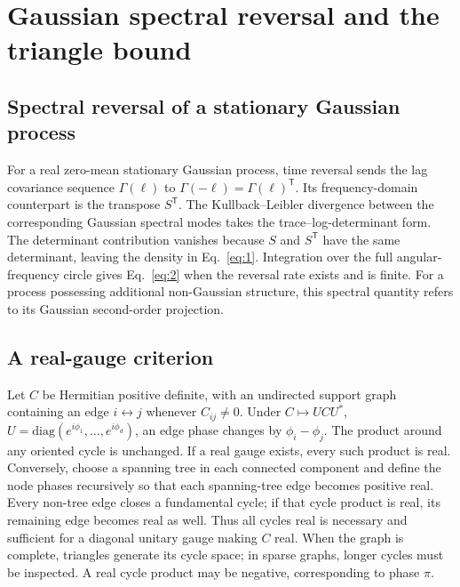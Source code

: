 \section{Gaussian spectral reversal and the triangle bound}\label{app:triangle}

\subsection{Spectral reversal of a stationary Gaussian process}
For a real zero-mean stationary Gaussian process, time reversal sends the lag covariance sequence $\Gamma(\ell)$ to $\Gamma(-\ell)=\Gamma(\ell)^\mathsf T$. Its frequency-domain counterpart is the transpose $S^\mathsf T$. The Kullback--Leibler divergence between the corresponding Gaussian spectral modes takes the trace--log-determinant form. The determinant contribution vanishes because $S$ and $S^\mathsf T$ have the same determinant, leaving the density in Eq.~\eqref{eq:1}. Integration over the full angular-frequency circle gives Eq.~\eqref{eq:2} when the reversal rate exists and is finite. For a process possessing additional non-Gaussian structure, this spectral quantity refers to its Gaussian second-order projection.

\subsection{A real-gauge criterion}
Let $C$ be Hermitian positive definite, with an undirected support graph containing an edge $i\!\leftrightarrow\!j$ whenever $C_{ij}\ne0$. Under $C\mapsto UCU^*$, $U=\mathrm{diag}(e^{i\phi_1},\ldots,e^{i\phi_d})$, an edge phase changes by $\phi_i-\phi_j$. The product around any oriented cycle is unchanged. If a real gauge exists, every such product is real. Conversely, choose a spanning tree in each connected component and define the node phases recursively so that each spanning-tree edge becomes positive real. Every non-tree edge closes a fundamental cycle; if that cycle product is real, its remaining edge becomes real as well. Thus all cycles real is necessary and sufficient for a diagonal unitary gauge making $C$ real. When the graph is complete, triangles generate its cycle space; in sparse graphs, longer cycles must be inspected. A real cycle product may be negative, corresponding to phase $\pi$.

